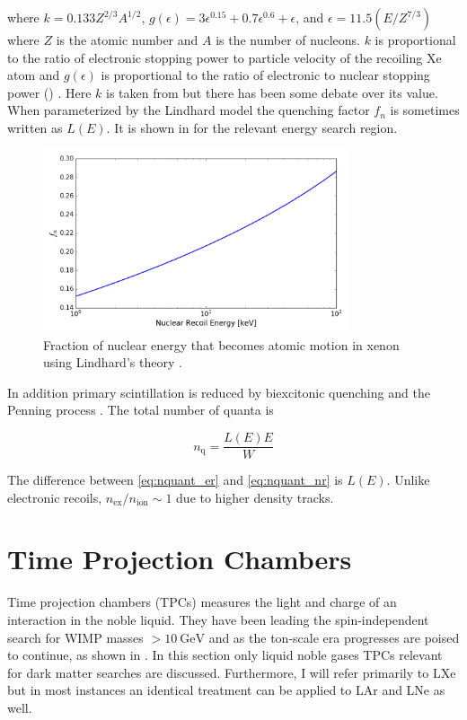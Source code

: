 \noindent where $k = 0.133Z^{2/3}A^{1/2}$, $g(\epsilon) = 3\epsilon^{0.15} + 0.7\epsilon^{0.6} + \epsilon$, and
$\epsilon = 11.5 (E / Z^{7/3})$ where $Z$ is the atomic number and $A$ is the number of nucleons.  $k$ is proportional to the ratio of
electronic stopping power to particle velocity of the recoiling Xe atom  and $g(\epsilon)$ is proportional
to the ratio of electronic to nuclear stopping power () .  Here $k$ is taken
from  but there has been some debate over its value.  When parameterized by the Lindhard model the quenching factor
$f_{n}$ is sometimes written as $L(E)$.  It is shown in  for the relevant energy search region.

\begin{figure}
\includegraphics[width=0.8\textwidth]{Lindhard}
\caption{Fraction of nuclear energy that becomes atomic motion in xenon using Lindhard's theory .}
\label{fig:lindhard}
\end{figure}

In addition primary scintillation is reduced by biexcitonic quenching and the Penning process .  The total
number of quanta is

\begin{equation}
n_{\mathrm{q}} = \frac{L(E) E}{W}
\label{eq:nquant_nr}
\end{equation}

\noindent The difference between \eqref{eq:nquant_er} and \eqref{eq:nquant_nr} is $L(E)$.  Unlike electronic recoils,
$n_{\mathrm{ex}} / n_{\mathrm{ion}} \sim 1$  due to higher density tracks.



\section{Time Projection Chambers}
\label{sec:tpcs}
Time projection chambers (TPCs) measures the light and charge of an interaction in the noble liquid.  They have been leading the
spin-independent search for WIMP masses $> 10\ \mathrm{GeV}$ and as the ton-scale era progresses are poised to continue, as shown in
.  In this section
only liquid noble gases TPCs relevant for dark matter searches are discussed.  Furthermore, I will refer primarily to LXe but in
most instances an identical treatment can be applied to LAr and LNe as well.

